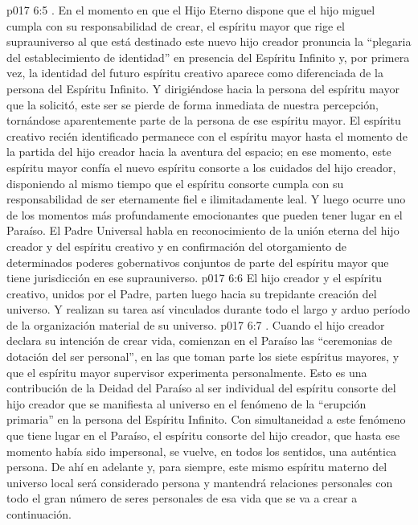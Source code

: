 \vs p017 6:5 . En el momento en que el Hijo Eterno dispone que el hijo miguel cumpla con su responsabilidad de crear, el espíritu mayor que rige el suprauniverso al que está destinado este nuevo hijo creador pronuncia la “plegaria del establecimiento de identidad” en presencia del Espíritu Infinito y, por primera vez, la identidad del futuro espíritu creativo aparece como diferenciada de la persona del Espíritu Infinito. Y dirigiéndose hacia la persona del espíritu mayor que la solicitó, este ser se pierde de forma inmediata de nuestra percepción, tornándose aparentemente parte de la persona de ese espíritu mayor. El espíritu creativo recién identificado permanece con el espíritu mayor hasta el momento de la partida del hijo creador hacia la aventura del espacio; en ese momento, este espíritu mayor confía el nuevo espíritu consorte a los cuidados del hijo creador, disponiendo al mismo tiempo que el espíritu consorte cumpla con su responsabilidad de ser eternamente fiel e ilimitadamente leal. Y luego ocurre uno de los momentos más profundamente emocionantes que pueden tener lugar en el Paraíso. El Padre Universal habla en reconocimiento de la unión eterna del hijo creador y del espíritu creativo y en confirmación del otorgamiento de determinados poderes gobernativos conjuntos de parte del espíritu mayor que tiene jurisdicción en ese suprauniverso.
\vs p017 6:6 El hijo creador y el espíritu creativo, unidos por el Padre, parten luego hacia su trepidante creación del universo. Y realizan su tarea así vinculados durante todo el largo y arduo período de la organización material de su universo.
\vs p017 6:7 . Cuando el hijo creador declara su intención de crear vida, comienzan en el Paraíso las “ceremonias de dotación del ser personal”, en las que toman parte los siete espíritus mayores, y que el espíritu mayor supervisor experimenta personalmente. Esto es una contribución de la Deidad del Paraíso al ser individual del espíritu consorte del hijo creador que se manifiesta al universo en el fenómeno de la “erupción primaria” en la persona del Espíritu Infinito. Con simultaneidad a este fenómeno que tiene lugar en el Paraíso, el espíritu consorte del hijo creador, que hasta ese momento había sido impersonal, se vuelve, en todos los sentidos, una auténtica persona. De ahí en adelante y, para siempre, este mismo espíritu materno del universo local será considerado persona y mantendrá relaciones personales con todo el gran número de seres personales de esa vida que se va a crear a continuación.
